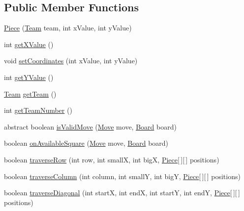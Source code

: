 \subsection*{Public Member Functions}
\begin{DoxyCompactItemize}
\item 
\hyperlink{class_framework_1_1_pieces_1_1_piece_a799b53db9458526b312ab23ac7f10700}{Piece} (\hyperlink{class_framework_1_1_team}{Team} team, int x\+Value, int y\+Value)
\item 
int \hyperlink{class_framework_1_1_pieces_1_1_piece_a4a7de4220140072732c013bb7c880022}{get\+X\+Value} ()
\item 
void \hyperlink{class_framework_1_1_pieces_1_1_piece_a62edc25d1604d7103c8f69ffe35700bd}{set\+Coordinates} (int x\+Value, int y\+Value)
\item 
int \hyperlink{class_framework_1_1_pieces_1_1_piece_a2c82ab150512df66e2e970f4a67553a0}{get\+Y\+Value} ()
\item 
\hyperlink{class_framework_1_1_team}{Team} \hyperlink{class_framework_1_1_pieces_1_1_piece_a2ad31621a379f060d2870e0ee20fdf82}{get\+Team} ()
\item 
int \hyperlink{class_framework_1_1_pieces_1_1_piece_a89cb4d3e939ba869775df9b10845ec9f}{get\+Team\+Number} ()
\item 
abstract boolean \hyperlink{class_framework_1_1_pieces_1_1_piece_afefa777905d65bca60e0954386549b84}{is\+Valid\+Move} (\hyperlink{class_framework_1_1_move}{Move} move, \hyperlink{class_framework_1_1_board}{Board} board)
\item 
boolean \hyperlink{class_framework_1_1_pieces_1_1_piece_a37f5106b3aae8a2b13857f6ce6bec328}{on\+Available\+Square} (\hyperlink{class_framework_1_1_move}{Move} move, \hyperlink{class_framework_1_1_board}{Board} board)
\item 
boolean \hyperlink{class_framework_1_1_pieces_1_1_piece_a4af002459d579221084a086acb86b3c5}{traverse\+Row} (int row, int smallX, int bigX, \hyperlink{class_framework_1_1_pieces_1_1_piece}{Piece}\mbox{[}$\,$\mbox{]}\mbox{[}$\,$\mbox{]} positions)
\item 
boolean \hyperlink{class_framework_1_1_pieces_1_1_piece_a0dbc47d481279fa4133546d5f0abe0ff}{traverse\+Column} (int column, int smallY, int bigY, \hyperlink{class_framework_1_1_pieces_1_1_piece}{Piece}\mbox{[}$\,$\mbox{]}\mbox{[}$\,$\mbox{]} positions)
\item 
boolean \hyperlink{class_framework_1_1_pieces_1_1_piece_acabfbee23b9c84fa70cc7b885b5e3a58}{traverse\+Diagonal} (int startX, int endX, int startY, int endY, \hyperlink{class_framework_1_1_pieces_1_1_piece}{Piece}\mbox{[}$\,$\mbox{]}\mbox{[}$\,$\mbox{]} positions)

\end{DoxyCompactItemize}
